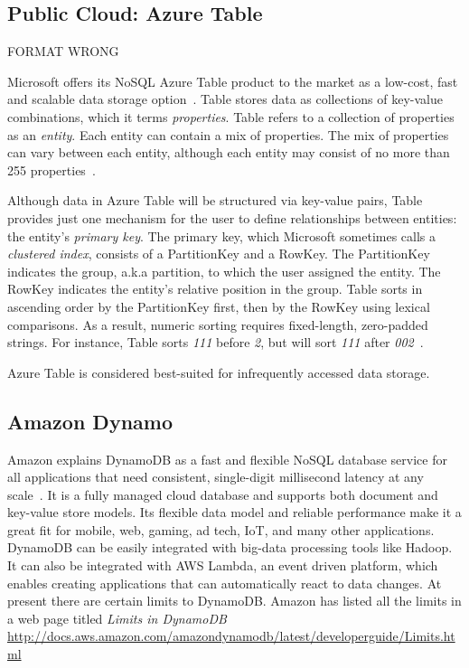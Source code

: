      \pv
     
\subsection{Public Cloud: Azure Table}

     FORMAT WRONG

     Microsoft offers its NoSQL Azure Table product to the market as a
     low-cost, fast and scalable data storage
     option~\cite{www-what-to-use}. Table stores data as collections
     of key-value combinations, which it terms \textit{properties}.  Table
     refers to a collection of properties as an \textit{entity}.  Each entity
     can contain a mix of properties.  The mix of properties can vary
     between each entity, although each entity may consist of no more
     than 255 properties~\cite{www-blobqueuetable}.

     Although data in Azure Table will be structured via key-value
     pairs, Table provides just one mechanism for the user to define
     relationships between entities: the entity's \textit{primary key}.  The
     primary key, which Microsoft sometimes calls a \textit{clustered index},
     consists of a PartitionKey and a RowKey.  The PartitionKey
     indicates the group, a.k.a partition, to which the user assigned
     the entity.  The RowKey indicates the entity's relative position
     in the group.  Table sorts in ascending order by the PartitionKey
     first, then by the RowKey using lexical comparisons.  As a
     result, numeric sorting requires fixed-length, zero-padded
     strings.  For instance, Table sorts \textit{111} before \textit{2}, but will
     sort \textit{111} after \textit{002}~\cite{www-scalable-partitioning}.

     Azure Table is considered best-suited for infrequently accessed
     data storage.

     \pv

\subsection{Amazon Dynamo}

Amazon explains DynamoDB as a fast and flexible NoSQL database service
for all applications that need consistent, single-digit millisecond
latency at any scale~\cite{www.dyndb}.  It is a fully managed cloud
database and supports both document and key-value store models.  Its
flexible data model and reliable performance make it a great fit for
mobile, web, gaming, ad tech, IoT, and many other applications.
DynamoDB can be easily integrated with big-data processing tools like
Hadoop. It can also be integrated with AWS Lambda, an event driven
platform, which enables creating applications that can automatically
react to data changes. At present there are certain limits to
DynamoDB. Amazon has listed all the limits in a web page titled
\textit{Limits in DynamoDB }
\url{http://docs.aws.amazon.com/amazondynamodb/latest/developerguide/Limits.html}

